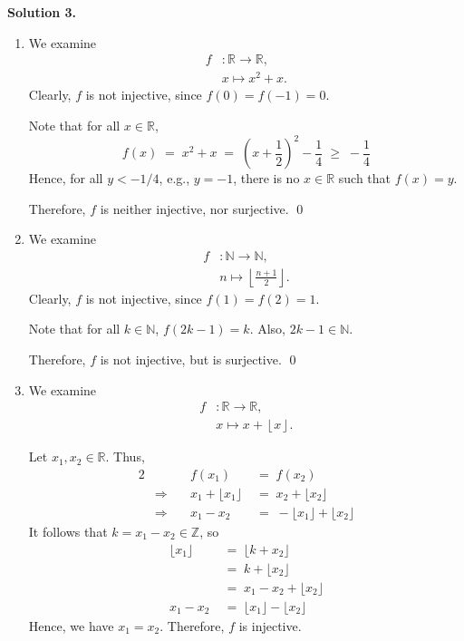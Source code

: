 \documentclass[10pt]{article}
\begin{document}
	\textbf{Solution 3.}\\
	\begin{enumerate}
		\item We examine
		\begin{align*}
			f&: \mathbb{R} \to \mathbb{R},\\
			&x \mapsto x^2 + x.
		\end{align*}
		Clearly, $f$ is not injective, since $f(0) = f(-1) = 0$.
		
		Note that for all $x \in \mathbb{R}$,
		\[
		f(x) \;=\; x^2 + x 
		\;=\; \left(x + \frac{1}{2}\right)^2 - \frac{1}{4}
		\;\geq\; -\frac{1}{4}
		\]
		Hence, for all $y < -1 /4$, e.g., $y = -1$, there is no $x \in \mathbb{R}$ such that $f(x) = y$.
		
		Therefore, $f$ is neither injective, nor surjective. \qed
		
		\item We examine
		\begin{align*}
			f&: \mathbb{N} \to \mathbb{N},\\
			&n \mapsto \left\lfloor \frac{n+1}{2}  \right\rfloor .
		\end{align*}
		Clearly, $f$ is not injective, since $f(1) = f(2) = 1$.
		
		Note that for all $k \in \mathbb{N}$, $f(2k - 1) = k$. Also, $2k-1 \in \mathbb{N}$.
		
		Therefore, $f$ is not injective, but is surjective. \qed
		
		\item We examine
		\begin{align*}
			f&: \mathbb{R} \to \mathbb{R},\\
			&x \mapsto x + \left\lfloor x \right\rfloor .
		\end{align*}
		
		Let $x_1, x_2 \in \mathbb{R}$. Thus,
		\begin{alignat*}{2}
			&&f(x_1) \;&=\; f(x_2) \\
			&\Rightarrow\quad& x_1 + \lfloor x_1\rfloor \;&=\; x_2 + \lfloor x_2\rfloor \\
			&\Rightarrow\quad& x_1 - x_2 \;&=\; -\lfloor x_1\rfloor + \lfloor x_2\rfloor
		\end{alignat*}
		It follows that $k = x_1 - x_2 \in \mathbb{Z}$, so
		\begin{align*}
			\lfloor x_1\rfloor \;&=\; \lfloor k + x_2\rfloor \\
			\;&=\; k + \lfloor x_2\rfloor \\
			\;&=\; x_1 - x_2 + \lfloor x_2 \rfloor \\
			x_1 - x_2 \;&=\; \lfloor x_1\rfloor - \lfloor x_2 \rfloor
		\end{align*}
		Hence, we have $x_1 = x_2$. Therefore, $f$ is injective.
		

\end{enumerate}
\end{document}

